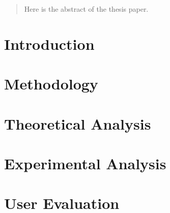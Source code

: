 \documentclass[12pt, a4paper]{report}
\author{oslo@itu.dk&ppho@itu.dk}
\begin{document}



\listoftodos



\begin{abstract}
Here is the abstract of the thesis paper.
\end{abstract}

\tableofcontents
\newpage



\label{chap:preface}

\restoregeometry
\newpage


\chapter{Introduction}
\label{chap:introduction}


\restoregeometry
\newpage

\chapter{Methodology}
\label{chap:methodology}


\restoregeometry
\newpage

\chapter{Theoretical Analysis}
\label{chap:theory}


\restoregeometry
\newpage

\chapter{Experimental Analysis}
\label{chap:experimentalAnalysis}


\restoregeometry
\newpage

\chapter{User Evaluation}
\label{chap:userEvaluation}


\end{document}
